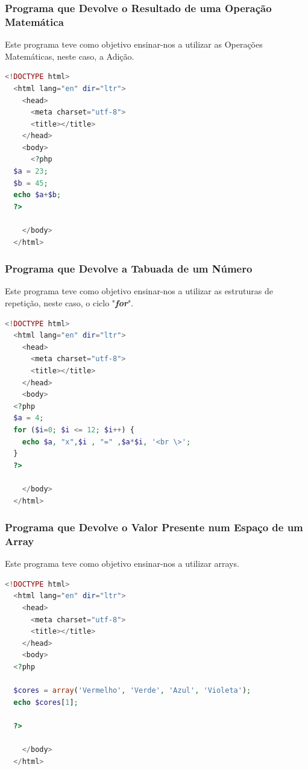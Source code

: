 \documentclass[14pt]{article}
\begin{document}
\subsubsection{Programa que Devolve o Resultado de uma Operação Matemática}

Este programa teve como objetivo ensinar-nos a utilizar as Operações Matemáticas, neste caso, a Adição.

\begin{lstlisting}[language=PHP]
  <!DOCTYPE html>
  <html lang="en" dir="ltr">
    <head>
      <meta charset="utf-8">
      <title></title>
    </head>
    <body>
      <?php
  $a = 23;
  $b = 45;
  echo $a+$b;
  ?>

    </body>
  </html>


\end{lstlisting}

\subsubsection{Programa que Devolve a Tabuada de um Número}

Este programa teve como objetivo ensinar-nos a utilizar as estruturas de repetição, neste caso, o ciclo "\textbf{\textit{for}}".

\begin{lstlisting}[language=PHP]
  <!DOCTYPE html>
  <html lang="en" dir="ltr">
    <head>
      <meta charset="utf-8">
      <title></title>
    </head>
    <body>
  <?php
  $a = 4;
  for ($i=0; $i <= 12; $i++) {
    echo $a, "x",$i , "=" ,$a*$i, '<br \>';
  }
  ?>

    </body>
  </html>


\end{lstlisting}

\subsubsection{Programa que Devolve o Valor Presente num Espaço de um Array}

Este programa teve como objetivo ensinar-nos a utilizar arrays.

\begin{lstlisting}[language=PHP]
  <!DOCTYPE html>
  <html lang="en" dir="ltr">
    <head>
      <meta charset="utf-8">
      <title></title>
    </head>
    <body>
  <?php

  $cores = array('Vermelho', 'Verde', 'Azul', 'Violeta');
  echo $cores[1];

  ?>

    </body>
  </html>

\end{lstlisting}
\end{document}
